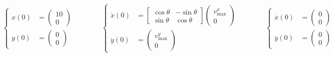 \documentclass[11pt]{article}
\begin{document}
  \[
    \begin{array}{l}
      \left\{
        \begin{aligned}
          x(0) &=
          \begin{pmatrix} 10 \\ 0
          \end{pmatrix} \\
          y(0) &=
          \begin{pmatrix} 0 \\ 0
          \end{pmatrix}
        \end{aligned}
        \right.
      \end{array}
      \hspace{3em}
      \begin{array}{l}
        \left\{
          \begin{aligned}
            \dot{x}(0) &=
            \begin{bmatrix}
              \cos\theta & -\sin\theta \\
              \sin\theta & \cos\theta
            \end{bmatrix}
            \begin{pmatrix}
              v^x_{\text{max}} \\
              0
            \end{pmatrix} \\
            \dot{y}(0) &=
            \begin{pmatrix} v^y_{\text{max}} \\ 0
            \end{pmatrix}
          \end{aligned}
          \right.
        \end{array}
        \hspace{3em}
        \begin{array}{l}
          \left\{
            \begin{aligned}
              \ddot{x}(0) &=
              \begin{pmatrix} 0 \\ 0
              \end{pmatrix} \\
              \ddot{y}(0) &=
              \begin{pmatrix} 0 \\ 0
              \end{pmatrix}
            \end{aligned}
            \right.
          \end{array}
        \]
\end{document}
